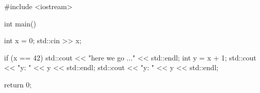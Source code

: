 \begin{consolethree}[escapeinside=||]
#include <iostream>

int main()
{    
     int x = 0;
     std::cin >> x;

     if (x == 42)
     {   
         std::cout << "here we go ..." <<
         std::endl;
         int y = x + 1;
         std::cout << "y: " << y << std::endl;
     }
     std::cout << "y: " << y << std::endl;

     return 0;
}
\end{consolethree}



















